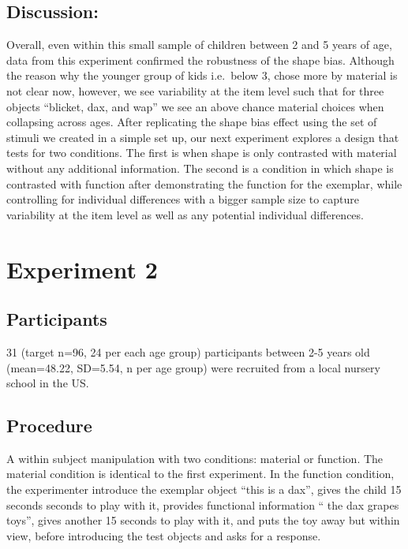 \documentclass[10pt, letterpaper]{article}
\begin{document}
\hypertarget{discussion}{%
\subsection{Discussion:}\label{discussion}}

Overall, even within this small sample of children between 2 and 5 years
of age, data from this experiment confirmed the robustness of the shape
bias. Although the reason why the younger group of kids i.e.~below 3,
chose more by material is not clear now, however, we see variability at
the item level such that for three objects ``blicket, dax, and wap'' we
see an above chance material choices when collapsing across ages. After
replicating the shape bias effect using the set of stimuli we created in
a simple set up, our next experiment explores a design that tests for
two conditions. The first is when shape is only contrasted with material
without any additional information. The second is a condition in which
shape is contrasted with function after demonstrating the function for
the exemplar, while controlling for individual differences with a bigger
sample size to capture variability at the item level as well as any
potential individual differences.

\hypertarget{experiment-2}{%
\section{Experiment 2}\label{experiment-2}}

\hypertarget{participants-1}{%
\subsection{Participants}\label{participants-1}}

31 (target n=96, 24 per each age group) participants between 2-5 years
old (mean=48.22, SD=5.54, n per age group) were recruited from a local
nursery school in the US.

\hypertarget{procedure-1}{%
\subsection{Procedure}\label{procedure-1}}

A within subject manipulation with two conditions: material or function.
The material condition is identical to the first experiment. In the
function condition, the experimenter introduce the exemplar object
``this is a dax'', gives the child 15 seconds seconds to play with it,
provides functional information `` the dax grapes toys'', gives another
15 seconds to play with it, and puts the toy away but within view,
before introducing the test objects and asks for a response.
\end{document}
